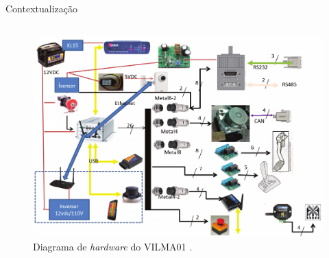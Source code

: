 \documentclass{if-beamer}
\begin{document}
\begin{frame}{Contextualização}
\begin{columns}
\begin{column}{0.6\textwidth}
			\begin{figure}[H]
				\centering
				\includegraphics[width=1\linewidth]{img/diagrama_vilma}
				\caption{Diagrama de \textit{hardware} do VILMA01 \cite{bedoya_alise_2016}.}
				\label{fig:diagrama_vilma}
			\end{figure}
			
		\end{column}
		
	\end{columns}
	
	
	
\end{frame}
\end{document}

